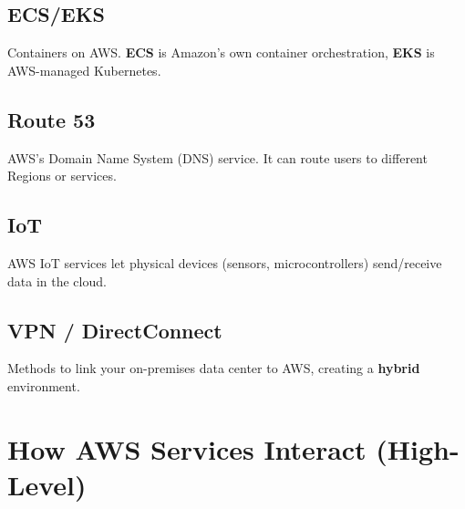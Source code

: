 \documentclass[12pt]{article}
\begin{document}
\subsection*{ECS/EKS}
Containers on AWS. \textbf{ECS} is Amazon's own container orchestration, \textbf{EKS} is AWS-managed Kubernetes.

\subsection*{Route 53}
AWS's Domain Name System (DNS) service. It can route users to different Regions or services.

\subsection*{IoT}
AWS IoT services let physical devices (sensors, microcontrollers) send/receive data in the cloud.

\subsection*{VPN / DirectConnect}
Methods to link your on-premises data center to AWS, creating a \textbf{hybrid} environment.

\clearpage

\section{How AWS Services Interact (High-Level)}
\end{document}
